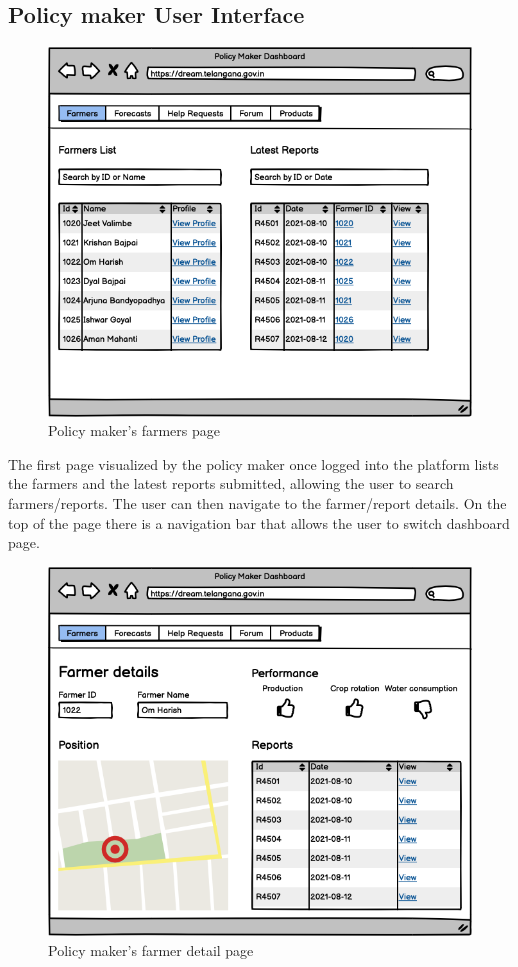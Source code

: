 \documentclass[10pt]{article} %
\begin{document}
\subsection{Policy maker User Interface}
\begin{figure}[h]
    \centering
    \includegraphics[scale=0.4]{images/uimockups/pm_farmers.png}
    \caption{Policy maker's farmers page}
    \label{fig:ui_pm_farmers}
\end{figure}
The first page visualized by the policy maker once logged into the platform lists the farmers and the latest reports submitted, allowing the
user to search farmers/reports. The user can then navigate to the farmer/report details. On the top of the page there is a navigation bar that
allows the user to switch dashboard page.\\
\begin{figure}[h]
    \centering
    \includegraphics[scale=0.4]{images/uimockups/pm_farmerdetails.png}
    \caption{Policy maker's farmer detail page}
    \label{fig:ui_pm_farmerdetails}
\end{figure}
\end{document}
